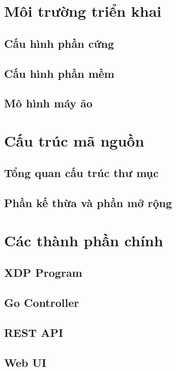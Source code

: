 \documentclass[../DoAn.tex]{subfiles}
\begin{document}
\section{Môi trường triển khai}

\subsection{Cấu hình phần cứng}

\subsection{Cấu hình phần mềm}

\subsection{Mô hình máy ảo}

\section{Cấu trúc mã nguồn}

\subsection{Tổng quan cấu trúc thư mục}

\subsection{Phần kế thừa và phần mở rộng}

\section{Các thành phần chính}

\subsection{XDP Program}

\subsection{Go Controller}

\subsection{REST API}

\subsection{Web UI}
\end{document}
